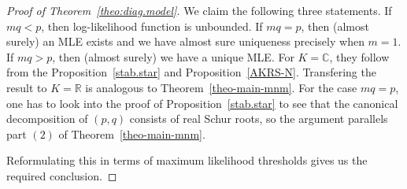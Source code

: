 \documentclass[11pt]{amsart}
\theoremstyle{definition}
\newcommand{\R}{{\mathbb R}}
\newcommand{\C}{{\mathbb C}}
\begin{document}
\begin{proof} [Proof of Theorem~\ref{theo:diag.model}]
We claim the following three statements. If $mq < p$, then log-likelihood function is unbounded. If $mq = p$, then (almost surely) an MLE exists and we have  almost sure uniqueness precisely when $m = 1$. If $mq > p$, then (almost surely) we have a unique MLE. For $K = \C$, they follow from the Proposition~\ref{stab.star} and Proposition~\ref{AKRS-N}. Transfering the result to $K = \R$ is analogous to Theorem~\ref{theo-main-mnm}. For the case $mq = p$, one has to look into the proof of Proposition~\ref{stab.star} to see that the canonical decomposition of $(p,q)$ consists of real Schur roots, so the argument parallels part $(2)$ of Theorem~\ref{theo-main-mnm}.

Reformulating this in terms of maximum likelihood thresholds gives us the required conclusion.
\end{proof}
\end{document}
